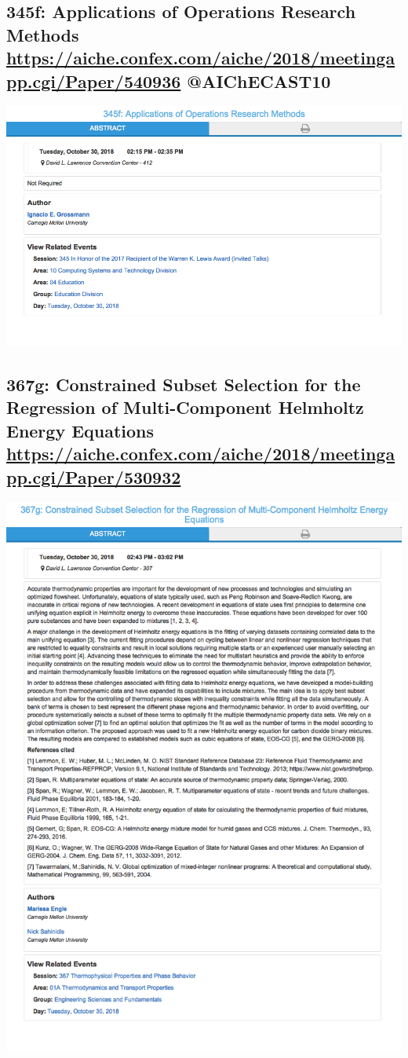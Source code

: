 \documentclass[11pt]{article}
\begin{document}
\subsection{345f: Applications of Operations Research Methods \url{https://aiche.confex.com/aiche/2018/meetingapp.cgi/Paper/540936} @AIChECAST10}
\label{sec:org666afd6}
\begin{center}
\includegraphics[width=.9\linewidth]{./540936.png}
\end{center}
\subsection{367g: Constrained Subset Selection for the Regression of Multi-Component Helmholtz Energy Equations \url{https://aiche.confex.com/aiche/2018/meetingapp.cgi/Paper/530932}}
\label{sec:org3c65972}
\begin{center}
\includegraphics[width=.9\linewidth]{./530932.png}
\end{center}
\end{document}
